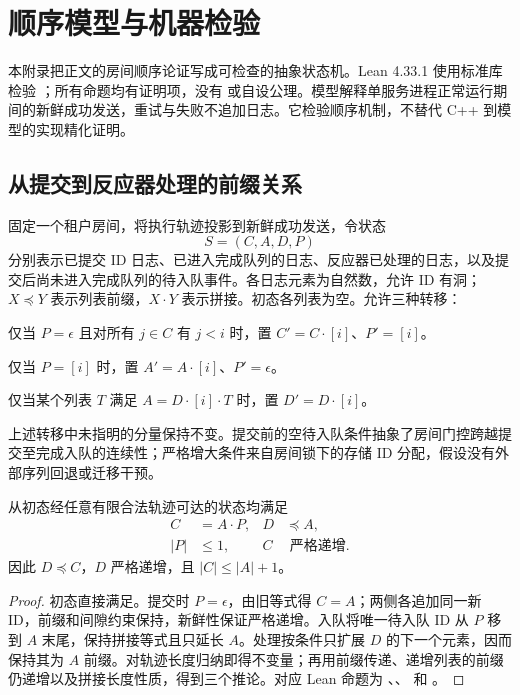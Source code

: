 \section{顺序模型与机器检验}
\label{app:formal}
本附录把正文的房间顺序论证写成可检查的抽象状态机。Lean 4.33.1 使用标准库检验 ；所有命题均有证明项，没有  或自设公理。模型解释单服务进程正常运行期间的新鲜成功发送，重试与失败不追加日志。它检验顺序机制，不替代 C++ 到模型的实现精化证明。

\subsection{从提交到反应器处理的前缀关系}
固定一个租户房间，将执行轨迹投影到新鲜成功发送，令状态
\[
 S=(C,A,D,P)
\]
分别表示已提交 ID 日志、已进入完成队列的日志、反应器已处理的日志，以及提交后尚未进入完成队列的待入队事件。各日志元素为自然数，允许 ID 有洞；\(X\preceq Y\) 表示列表前缀，\(X\cdot Y\) 表示拼接。初态各列表为空。允许三种转移：
\begin{description}[leftmargin=1.2em,style=nextline]
\item[提交 \(\operatorname{commit}(i)\)]
仅当 \(P=\epsilon\) 且对所有 \(j\in C\) 有 \(j<i\) 时，置 \(C'=C\cdot[i]\)、\(P'=[i]\)。
\item[入队 \(\operatorname{admit}(i)\)]
仅当 \(P=[i]\) 时，置 \(A'=A\cdot[i]\)、\(P'=\epsilon\)。
\item[处理 \(\operatorname{drain}(i)\)]
仅当某个列表 \(T\) 满足 \(A=D\cdot[i]\cdot T\) 时，置 \(D'=D\cdot[i]\)。
\end{description}
上述转移中未指明的分量保持不变。提交前的空待入队条件抽象了房间门控跨越提交至完成入队的连续性；严格增大条件来自房间锁下的存储 ID 分配，假设没有外部序列回退或迁移干预。

\begin{proposition}[可达状态不变量]
从初态经任意有限合法轨迹可达的状态均满足
\begin{align}
C &= A\cdot P, & D&\preceq A,\label{eq:prefix}\\
|P|&\leq 1, & C&\text{ 严格递增}.\label{eq:increasing}
\end{align}
因此 \(D\preceq C\)，\(D\) 严格递增，且
\( |C|\leq |A|+1 \)。
\end{proposition}
\begin{proof}
初态直接满足。提交时 \(P=\epsilon\)，由旧等式得 \(C=A\)；两侧各追加同一新 ID，前缀和间隙约束保持，新鲜性保证严格递增。入队将唯一待入队 ID 从 \(P\) 移到 \(A\) 末尾，保持拼接等式且只延长 \(A\)。处理按条件只扩展 \(D\) 的下一个元素，因而保持其为 \(A\) 前缀。对轨迹长度归纳即得不变量；再用前缀传递、递增列表的前缀仍递增以及拼接长度性质，得到三个推论。对应 Lean 命题为 、、 和 。
\end{proof}

